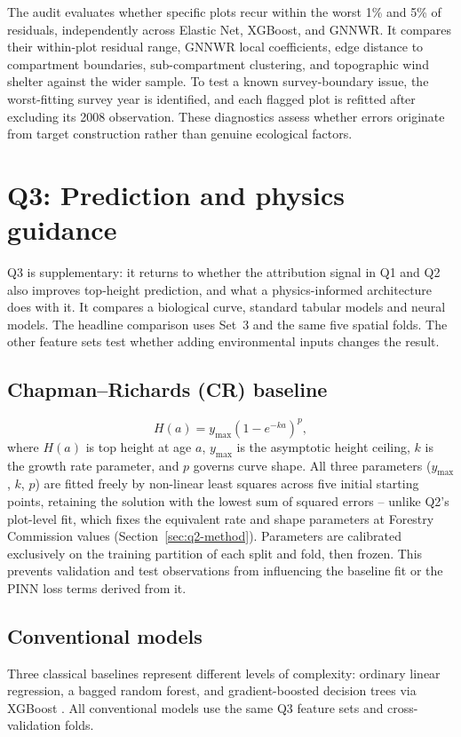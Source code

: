The audit evaluates whether specific plots recur within the worst 1\% and 5\% of residuals, independently across Elastic Net, XGBoost, and GNNWR. It compares their within-plot residual range, GNNWR local coefficients, edge distance to compartment boundaries, sub-compartment clustering, and topographic wind shelter against the wider sample. To test a known survey-boundary issue, the worst-fitting survey year is identified, and each flagged plot is refitted after excluding its 2008 observation. These diagnostics assess whether errors originate from target construction rather than genuine ecological factors.

\section{Q3: Prediction and physics guidance}
\label{sec:rq1-method}
\label{sec:q3-method}

Q3 is supplementary: it returns to whether the attribution signal in Q1 and Q2 also
improves top-height prediction, and what a physics-informed architecture does with it.
It compares a biological curve, standard tabular models and neural models. The headline
comparison uses Set~3 and the same five spatial folds. The other feature sets test whether adding
environmental inputs changes the result.

\subsection{Chapman--Richards (CR) baseline}
\begin{equation}
H(a) = y_{\max}\left(1 - e^{-ka}\right)^p,
\label{eq:cr}
\end{equation}
where $H(a)$ is top height at age $a$, $y_{\max}$ is the asymptotic height ceiling, $k$ is the growth rate parameter, and $p$ governs curve shape. All three parameters ($y_{\max}$, $k$, $p$) are fitted freely by non-linear least squares across five initial starting points, retaining the solution with the lowest sum of squared errors -- unlike Q2's plot-level fit, which fixes the equivalent rate and shape parameters at Forestry Commission values (Section~\ref{sec:q2-method}). Parameters are calibrated exclusively on the training partition of each split and fold, then frozen. This prevents validation and test observations from influencing the baseline fit or the PINN loss terms derived from it.

\subsection*{Conventional models}
Three classical baselines represent different levels of complexity: ordinary linear regression, a bagged random forest, and gradient-boosted decision trees via XGBoost \cite{chen2016XGBoost_C4_NN}. All conventional models use the same Q3 feature sets and cross-validation folds.

